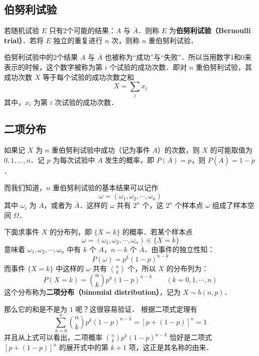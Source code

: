 
\subsection{伯努利试验}
\begin{definition}{}
若随机试验 $E$ 只有2个可能的结果：$A$ 与 $\overline{A}$．则称 $E$ 为\textbf{伯努利试验（Bernoulli trial）}．若将 $E$ 独立的重复进行 $n$ 次，则称 $n$ 重伯努利试验．
\end{definition}
伯努利试验中的2个结果 $A$ 与 $\overline{A}$ 也被称为“成功”与“失败”．所以当用数字1和0来表示的时候，这个数字被称为第 $i$ 个试验的成功次数．即对 $n$ 重伯努利试验，其成功次数 $X$ 等于每个试验的成功次数之和
\begin{equation}
X=\sum_i x_i
\end{equation}
其中，$x_i$ 为第 $i$ 次试验的成功次数．
\subsection{二项分布}
如果记 $X $ 为 $n $ 重伯努利试验中成功（记为事件 $A$）的次数，则 $X $ 的可能取值为 $0,1,\dots,n$．记 $p $ 为每次试验中 $A $ 发生的概率，即 $P(A)=p$，则 $P(\overline{A})=1-p$．

而我们知道，$n$ 重伯努利试验的基本结果可以记作
\begin{equation}
\omega=\left(\omega_{1}, \omega_{2}, \cdots, \omega_{n}\right)
\end{equation}
其中 $\omega_i$ 为 $A$，或者为 $\overline{A}$．这样的 $\omega$ 共有 $2^n$ 个，这 $2^n$ 个样本点 $\omega$ 组成了样本空间 $\Omega$．

下面求事件 $X$ 的分布列，即 $\{X=k\}$ 的概率．若某个样本点
\begin{equation}
\omega=\left(\omega_{1}, \omega_{2}, \cdots, \omega_{n}\right) \in\{X=k\}
\end{equation}
意味着 $\omega_1,\omega_2,\cdots,\omega_n$ 中有 $k$ 个 $A$，$n-k$ 个 $\overline A$．由事件的独立性知：
\begin{equation}
P(\omega)=p^{k}(1-p)^{n-k}
\end{equation}
而事件 $\{X=k\}$ 中这样的 $\omega$ 共有 $\binom nk$ 个，所以 $X$ 的分布列为：
\begin{equation}
P(X=k)=\binom nk p^{k}(1-p)^{n-k} \qquad (k=0,1, \cdots, n)
\end{equation}
这个分布称为\textbf{二项分布（binomial distribution）}，记为 $X\sim b(n, p)$．

那么它的和是不是为 $1$ 呢？这很容易验证． 根据二项式定理有
\begin{equation}
\sum_{k=0}^{n}\binom nk p^{k}(1-p)^{n-k}=[p+(1-p)]^{n}=1
\end{equation}
并且从上式可以看出，二项概率 $\binom nk p^{k}(1-p)^{n-k}$ 恰好是二项式 $[p+(1-p)]^{n}$ 的展开式中的第 $k+1$ 项，这正是其名称的由来．

